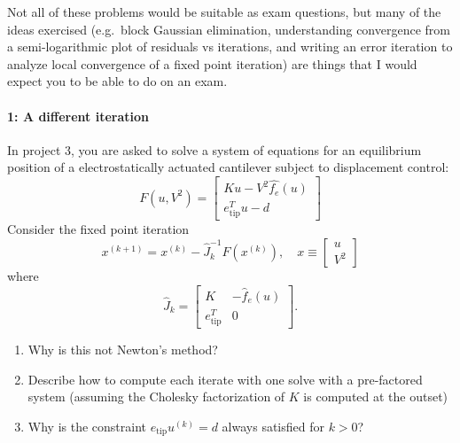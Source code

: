 \documentclass[12pt, leqno]{article}
\begin{document}

Not all of these problems would be suitable as exam questions, but
many of the ideas exercised (e.g.~block Gaussian elimination,
understanding convergence from a semi-logarithmic plot of residuals vs
iterations, and writing an error iteration to analyze local
convergence of a fixed point iteration) are things that I would expect
you to be able to do on an exam.

\paragraph*{1: A different iteration}
In project 3, you are asked to solve a system of equations
for an equilibrium position of a electrostatically actuated
cantilever subject to displacement control:
\[
F(u,V^2) =
\begin{bmatrix}
  Ku-V^2 \hat{f_e}(u) \\
  e_{\mathrm{tip}}^T u - d
\end{bmatrix}
\]
Consider the fixed point iteration
\[
  x^{(k+1)} = x^{(k)} - \hat{J}_k^{-1} F(x^{(k)}), \quad x
  \equiv \begin{bmatrix} u \\ V^2 \end{bmatrix}
\]
where
\[
\hat{J}_k =
\begin{bmatrix}
  K & -\hat{f}_e(u) \\
  e_{\mathrm{tip}}^T & 0
\end{bmatrix}.
\]
\begin{enumerate}
\item Why is this not Newton's method?
\item Describe how to compute each iterate with one solve with a
  pre-factored system (assuming the Cholesky factorization of $K$ is
  computed at the outset)
\item Why is the constraint $e_{\mathrm{tip}} u^{(k)} = d$ always
  satisfied for $k > 0$?
\end{enumerate}
\end{document}
